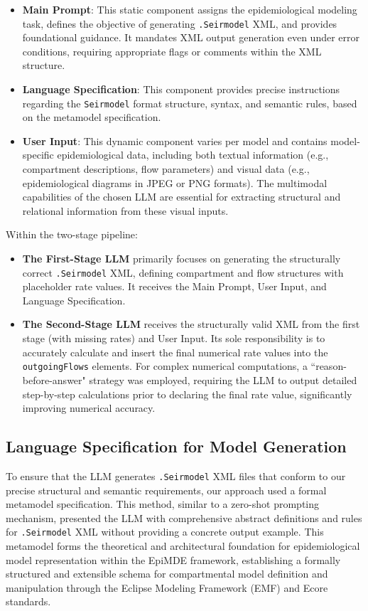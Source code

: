 \documentclass[conference]{IEEEtran}
\begin{document}
\begin{itemize}
 \item \textbf{Main Prompt}: This static component assigns the epidemiological modeling task, defines the objective of generating \texttt{.Seirmodel} XML, and provides foundational guidance. It mandates XML output generation even under error conditions, requiring appropriate flags or comments within the XML structure.
 \item \textbf{Language Specification}: This component provides precise instructions regarding the \texttt{Seirmodel} format structure, syntax, and semantic rules, based on the metamodel specification.
 \item \textbf{User Input}: This dynamic component varies per model and contains model-specific epidemiological data, including both textual information (e.g., compartment descriptions, flow parameters) and visual data (e.g., epidemiological diagrams in JPEG or PNG formats). The multimodal capabilities of the chosen LLM are essential for extracting structural and relational information from these visual inputs.
\end{itemize}

Within the two-stage pipeline:

\begin{itemize}
 \item \textbf{The First-Stage LLM} primarily focuses on generating the structurally correct \texttt{.Seirmodel} XML, defining compartment and flow structures with placeholder rate values. It receives the Main Prompt, User Input, and Language Specification.
 \item \textbf{The Second-Stage LLM} receives the structurally valid XML from the first stage (with missing rates) and User Input. Its sole responsibility is to accurately calculate and insert the final numerical rate values into the \texttt{outgoingFlows} elements. For complex numerical computations, a ``reason-before-answer" strategy was employed, requiring the LLM to output detailed step-by-step calculations prior to declaring the final rate value, significantly improving numerical accuracy.
\end{itemize}

\subsection{Language Specification for Model Generation}
To ensure that the LLM generates \texttt{.Seirmodel} XML files that conform to our precise structural and semantic requirements, our approach used a formal metamodel specification. This method, similar to a zero-shot prompting mechanism, presented the LLM with comprehensive abstract definitions and rules for \texttt{.Seirmodel} XML without providing a concrete output example. This metamodel forms the theoretical and architectural foundation for epidemiological model representation within the EpiMDE framework, establishing a formally structured and extensible schema for compartmental model definition and manipulation through the Eclipse Modeling Framework (EMF) and Ecore standards.
\end{document}

